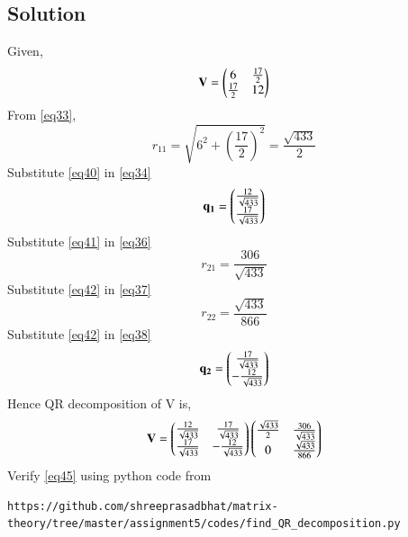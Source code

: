 \documentclass[journal,12pt,twocolumn]{IEEEtran}
\begin{document}
\subsection{Solution}
Given,
\begin{equation}\label{eq39}
	\mathbf{V} = \begin{pmatrix}6 & \frac{17}{2}\\ \frac{17}{2} & 12\end{pmatrix}
\end{equation}
From \eqref{eq33},
\begin{equation}\label{eq40}
	r_{11} = \sqrt{6^2 + \left(\frac{17}{2}\right)^2} = \frac{\sqrt{433}}{2}
\end{equation}
Substitute \eqref{eq40} in \eqref{eq34}
\begin{equation}\label{eq41}
	\mathbf{q_1} = \begin{pmatrix}\frac{12}{\sqrt{433}} \\ \frac{17}{\sqrt{433}}\end{pmatrix}
\end{equation}
Substitute \eqref{eq41} in \eqref{eq36}
\begin{equation}\label{eq42}
	r_{21} = \frac{306}{\sqrt{433}}
\end{equation}
Substitute \eqref{eq42} in \eqref{eq37}
\begin{equation}\label{eq43}
	r_{22} = \frac{\sqrt{433}}{866}
\end{equation}
Substitute \eqref{eq42} in \eqref{eq38}
\begin{equation}\label{eq44}
	\mathbf{q_2} = \begin{pmatrix}\frac{17}{\sqrt{433}} \\ -\frac{12}{\sqrt{433}}\end{pmatrix}
\end{equation}
Hence QR decomposition of V is,
\begin{equation}\label{eq45}
	\mathbf{V} = \begin{pmatrix}\frac{12}{\sqrt{433}} & \frac{17}{\sqrt{433}}\\
				\frac{17}{\sqrt{433}} & -\frac{12}{\sqrt{433}}\end{pmatrix}
			  \begin{pmatrix}\frac{\sqrt{433}}{2} & \frac{306}{\sqrt{433}}\\
			  0 & \frac{\sqrt{433}}{866}\end{pmatrix}
\end{equation}
Verify \eqref{eq45} using python code from
\begin{lstlisting}
https://github.com/shreeprasadbhat/matrix-theory/tree/master/assignment5/codes/find_QR_decomposition.py
\end{lstlisting}
\end{document}
